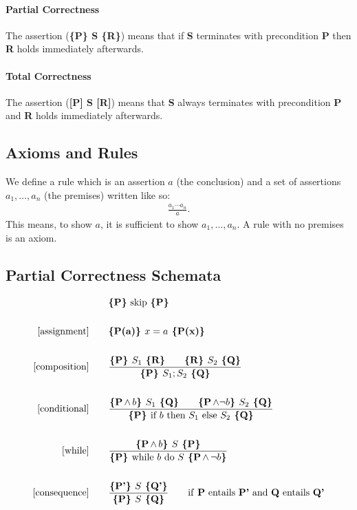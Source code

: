 \documentclass[a4paper, 12pt, twoside]{article}
\begin{document}
\paragraph{Partial Correctness} The assertion (\textbf{\{P\} S \{R\}})
means that if \textbf{S} terminates with precondition \textbf{P}
then \textbf{R} holds immediately afterwards.

\paragraph{Total Correctness} The assertion (\textbf{[P] S [R]})
means that \textbf{S} always terminates with precondition \textbf{P}
and \textbf{R} holds immediately afterwards.

\subsection{Axioms and Rules}

We define a rule which is an assertion $a$ (the conclusion)
and a set of assertions $a_1, \ldots, a_n$ (the premises)
written like so: \begin{gather*}
  \frac{a_1 \cdots a_n}{a}.
\end{gather*} This means, to show $a$, it is sufficient to show
$a_1, \ldots, a_n$. A rule with no premises is an axiom.

\subsection{Partial Correctness Schemata}

\begin{align*}
  [\text{skip}]& \qquad \textbf{\{P\}} \text{ skip } \textbf{\{P\}} \\ \\
  [\text{assignment}]& \qquad \textbf{\{P(a)\} } x = a \textbf{ \{P(x)\}} \\ \\
  [\text{composition}]& \qquad \frac{
    \textbf{\{P\} } S_1 \textbf{ \{R\}} \qquad
    \textbf{\{R\} } S_2 \textbf{ \{Q\}}
  }{
    \textbf{\{P\} } S_1; S_2 \textbf{ \{Q\}}
  } \\ \\
  [\text{conditional}]& \qquad \frac{
    \textbf{\{P$\, \land \, b$\} } S_1 \textbf{ \{Q\}} \qquad
    \textbf{\{P$\, \land \neg b$\} } S_2 \textbf{ \{Q\}}
  }{
    \textbf{\{P\} } \text{if } b \text{ then } S_1 \text{ else } S_2 \textbf{ \{Q\}}
  } \\ \\
  [\text{while}]& \qquad \frac{
    \textbf{\{P$\, \land \, b$\} } S \textbf{ \{P\}}
  }{
    \textbf{\{P\} } \text{while } b \text{ do } S \textbf{ \{P$\, \land \, \neg b$\}}
  } \\ \\
  [\text{consequence}]& \qquad \frac{
    \textbf{\{P'\} } S \textbf{ \{Q'\}}
  }{
    \textbf{\{P\} } S \textbf{ \{Q\}}
  } \qquad \text{if \textbf{P} entails \textbf{P'} and \textbf{Q} entails \textbf{Q'}} 
\end{align*}
\end{document}
